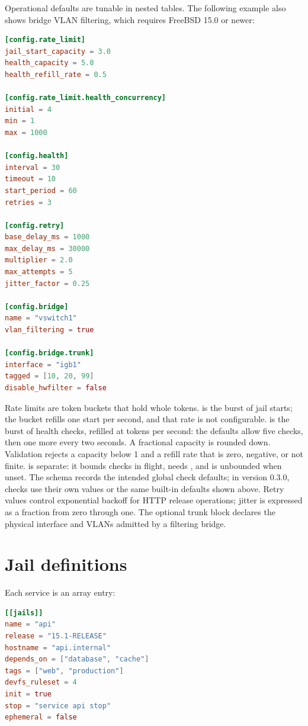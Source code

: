 Operational defaults are tunable in nested tables. The following example also
shows bridge VLAN filtering, which requires FreeBSD 15.0 or newer:

\begin{lstlisting}[language=TOML]
[config.rate_limit]
jail_start_capacity = 3.0
health_capacity = 5.0
health_refill_rate = 0.5

[config.rate_limit.health_concurrency]
initial = 4
min = 1
max = 1000

[config.health]
interval = 30
timeout = 10
start_period = 60
retries = 3

[config.retry]
base_delay_ms = 1000
max_delay_ms = 30000
multiplier = 2.0
max_attempts = 5
jitter_factor = 0.25

[config.bridge]
name = "vswitch1"
vlan_filtering = true

[config.bridge.trunk]
interface = "igb1"
tagged = [10, 20, 99]
disable_hwfilter = false
\end{lstlisting}

Rate limits are token buckets that hold whole tokens.
 is the burst of jail starts; the bucket refills
one start per second, and that rate is not configurable.
 is the burst of health checks, refilled at
 tokens per second: the defaults allow five
checks, then one more every two seconds. A fractional capacity is rounded down.
Validation rejects a capacity below 1 and a refill rate that is zero, negative,
or not finite.  is separate: it bounds checks in
flight, needs , and is unbounded when unset. The
 schema records the intended global check defaults; in
version 0.3.0, checks use their own values or the same built-in defaults shown
above. Retry values control exponential backoff for HTTP release operations;
jitter is expressed as a fraction from zero through one. The optional trunk
block declares the physical interface and VLANs admitted by a filtering bridge.

\section{Jail definitions}

Each service is an array entry:

\begin{lstlisting}[language=TOML]
[[jails]]
name = "api"
release = "15.1-RELEASE"
hostname = "api.internal"
depends_on = ["database", "cache"]
tags = ["web", "production"]
devfs_ruleset = 4
init = true
stop = "service api stop"
ephemeral = false
\end{lstlisting}

